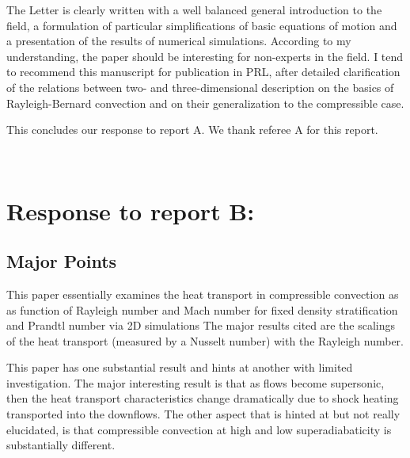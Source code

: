 \documentclass[aps, 11pt, singlecolumn]{revtex4-1} %
\begin{document}
\begin{singlespace}
\begin{myquotation}
The Letter is clearly written with a well balanced general
introduction to the field, a formulation of particular simplifications
of basic equations of motion and a presentation of the results of
numerical simulations. According to my understanding, the paper should
be interesting for non-experts in the field. I tend to recommend this
manuscript for publication in PRL, after detailed clarification of the
relations between two- and three-dimensional description on the basics
of Rayleigh-Bernard convection and on their generalization to the
compressible case.
\end{myquotation}

This concludes our response to report A.  We thank referee A for this report.




$\,$
\newline
$\,$
\newline

\section{Response to report B:}

\subsection{Major Points}

\begin{myquotation}
This paper essentially examines the heat transport in compressible
convection as as function of Rayleigh number and Mach number for fixed
density stratification and Prandtl number via 2D simulations The major
results cited are the scalings of the heat transport (measured by a
Nusselt number) with the Rayleigh number.

This paper has one substantial result and hints at another with
limited investigation. The major interesting result is that as flows
become supersonic, then the heat transport characteristics change
dramatically due to shock heating transported into the downflows. The
other aspect that is hinted at but not really elucidated, is that
compressible convection at high and low superadiabaticity is
substantially different.


\end{myquotation}
\end{singlespace}
\end{document}
